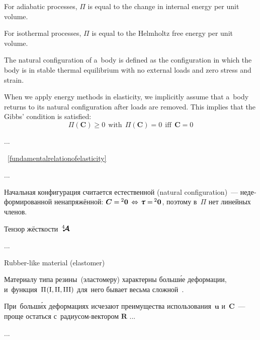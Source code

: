 \begin{otherlanguage}{russian}
{For adiabatic processes, ${\Pi}$ is equal to the change in internal energy per unit volume.

For isothermal processes, ${\Pi}$ is equal to the Helmholtz free energy per unit volume.

The natural configuration of a~body is defined as the configuration in which the body is in stable thermal equilibrium with no external loads and zero stress and strain.

When we apply energy methods in elasticity, we implicitly assume that a~body returns to its natural configuration after loads are removed. This implies that the Gibbs’ condition is satisfied:
\[ \Pi({\boldsymbol{\bm{C}}}) \geq 0~~{\text{with}}~~\Pi({\boldsymbol{\bm{C}}}) = 0~~{\text{iff}}~~{\boldsymbol{\bm{C}}} = 0 \]

\par}

...



\end{otherlanguage}



~\eqref{fundamentalrelationofelasticity}

...

\begin{otherlanguage}{russian}

\noindent Начальная конфигурация считается естественной (natural configuration)~--- недеформированной ненапряжённой: ${\bm{C} = \hspace{-0.1ex} {^2\bm{0}} \hspace{.4ex} \Leftrightarrow \hspace{.2ex} \cauchystress = \hspace{-0.2ex} {^2\bm{0}}}$, поэтому в~$\Pi$ нет линейных членов.

Тензор жёсткости~$\hspace{.08ex}{^4\hspace{-0.72ex}\bm{\mathcal{A}}}\hspace{.08ex}$

...

Rubber\hbox{-}like material (elastomer)

Материалу типа резины~(эластомеру) характерны больш\'{и}е деформации, и~функция~${\Pi\hspace{.12ex}(\mathrm{I}, \mathrm{II}, \mathrm{III})}$ для~него бывает весьма сложной~\cite{haroldalexander-rubberlike}.

При~больш\'{и}х деформациях исчезают преимущества использования~$\bm{u}$ и~$\bm{C}$~--- проще остаться с~радиусом\hbox{-}вектором $\bm{R}$ ...

...



\end{otherlanguage}

